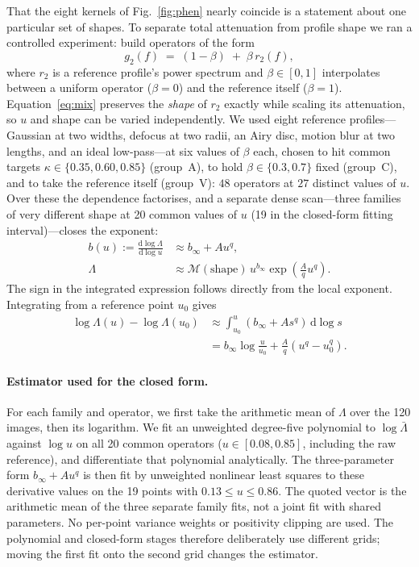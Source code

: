 \documentclass[10pt,journal]{IEEEtran}
\newcommand{\Lam}{\Lambda}
\newcommand{\kunif}{\kappa}
\begin{document}
That the eight kernels of Fig.~\ref{fig:phen} nearly coincide is a statement about one
particular set of shapes. To separate total attenuation from profile shape we ran a controlled
experiment: build operators of the form
\begin{equation}
  g_2(f) \;=\; (1-\beta) \;+\; \beta\, r_2(f),
  \label{eq:mix}
\end{equation}
where $r_2$ is a reference profile's power spectrum and $\beta\in[0,1]$ interpolates between a
uniform operator ($\beta=0$) and the reference itself ($\beta=1$). Equation~\eqref{eq:mix}
preserves the \emph{shape} of $r_2$ exactly while scaling its attenuation, so $u$ and shape can
be varied independently. We used eight reference profiles---Gaussian at two widths, defocus at
two radii, an Airy disc, motion blur at two lengths, and an ideal low-pass---at six values of
$\beta$ each, chosen to hit common targets $\kunif\in\{0.35,0.60,0.85\}$ (group~A), to hold
$\beta\in\{0.3,0.7\}$ fixed (group~C), and to take the reference itself (group~V): $48$
operators at $27$ distinct values of $u$. Over these the dependence factorises, and a separate
dense scan---three families of very different shape at 20 common values of $u$ (19 in the
closed-form fitting interval)---closes the exponent:
\begin{equation}
  \begin{aligned}
  b(u):=\frac{\mathrm d\log\Lam}{\mathrm d\log u}
  &\approx b_\infty+A u^q,\\
  \Lam&\approx \mathcal M(\mathrm{shape})\,u^{b_\infty}
  \exp\!\left(\frac{A}{q}u^q\right).
  \end{aligned}
  \label{eq:law}
\end{equation}
The sign in the integrated expression follows directly from the local exponent. Integrating
from a reference point $u_0$ gives
\begin{align}
  \log\Lam(u)-\log\Lam(u_0)
  &\approx \int_{u_0}^{u}(b_\infty+As^q)\,\mathrm d\log s\nonumber\\
  &=b_\infty\log\frac{u}{u_0}+\frac{A}{q}(u^q-u_0^q).
  \label{eq:law_derivation}
\end{align}
\paragraph*{Estimator used for the closed form.}
For each family and operator, we first take the arithmetic mean of $\Lam$ over the 120 images,
then its logarithm. We fit an unweighted degree-five polynomial to $\log\bar\Lam$ against
$\log u$ on all 20 common operators ($u\in[0.08,0.85]$, including the raw reference), and
differentiate that polynomial analytically. The three-parameter form $b_\infty+Au^q$ is then
fit by unweighted nonlinear least squares to these derivative values on the 19 points with
$0.13\le u\le0.86$. The quoted vector is the arithmetic mean of the three separate family fits,
not a joint fit with shared parameters. No per-point variance weights or positivity clipping
are used. The polynomial and closed-form stages therefore deliberately use different grids;
moving the first fit onto the second grid changes the estimator.
\end{document}
